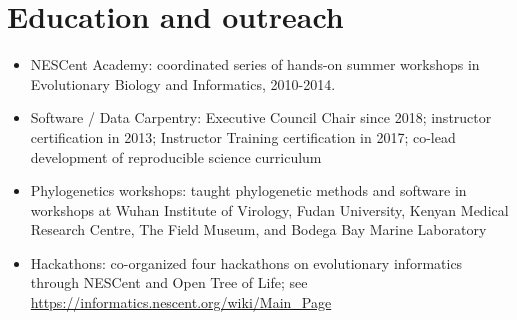 \documentclass[10pt]{article}
\begin{document}
\section*{Education and outreach}

\begin{itemize}
\item{NESCent Academy: coordinated series of hands-on summer workshops in Evolutionary Biology and Informatics, 2010-2014.}
\item{Software / Data Carpentry: Executive Council Chair since 2018; instructor certification in 2013; Instructor Training certification in 2017; co-lead development of reproducible science curriculum}
\item{Phylogenetics workshops: taught phylogenetic methods and software in workshops at Wuhan Institute of Virology, Fudan University, Kenyan Medical Research Centre, The Field Museum, and Bodega Bay Marine Laboratory} 
\item{Hackathons: co-organized four hackathons on evolutionary informatics through NESCent and Open Tree of Life; see \url{https://informatics.nescent.org/wiki/Main_Page}}
\end{itemize}

\end{document}
